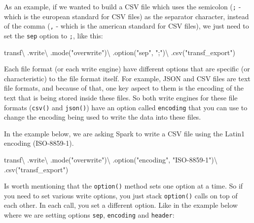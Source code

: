 \documentclass[
  11pt,
  letterpaper,
  DIV=11,
  numbers=noendperiod]{scrreprt}
\newenvironment{Shaded}{\begin{snugshade}}{\end{snugshade}}
\newcommand{\NormalTok}[1]{\textcolor[rgb]{0.00,0.23,0.31}{#1}}
\newcommand{\OperatorTok}[1]{\textcolor[rgb]{0.37,0.37,0.37}{#1}}
\newcommand{\StringTok}[1]{\textcolor[rgb]{0.13,0.47,0.30}{#1}}
\begin{document}
As an example, if we wanted to build a CSV file which uses the semicolon
(\texttt{;} - which is the european standard for CSV files) as the
separator character, instead of the comma (\texttt{,} - which is the
american standard for CSV files), we just need to set the \texttt{sep}
option to \texttt{;}, like this:

\begin{Shaded}
\begin{Highlighting}[]
\NormalTok{transf}\OperatorTok{\textbackslash{}}
\NormalTok{    .write}\OperatorTok{\textbackslash{}}
\NormalTok{    .mode(}\StringTok{"overwrite"}\NormalTok{)}\OperatorTok{\textbackslash{}}
\NormalTok{    .option(}\StringTok{"sep"}\NormalTok{, }\StringTok{";"}\NormalTok{)}\OperatorTok{\textbackslash{}}
\NormalTok{    .csv(}\StringTok{"transf\_export"}\NormalTok{)}
\end{Highlighting}
\end{Shaded}

Each file format (or each write engine) have different options that are
specific (or characteristic) to the file format itself. For example,
JSON and CSV files are text file formats, and because of that, one key
aspect to them is the encoding of the text that is being stored inside
these files. So both write engines for these file formats
(\texttt{csv()} and \texttt{json()}) have an option called
\texttt{encoding} that you can use to change the encoding being used to
write the data into these files.

In the example below, we are asking Spark to write a CSV file using the
Latin1 encoding (ISO-8859-1).

\begin{Shaded}
\begin{Highlighting}[]
\NormalTok{transf}\OperatorTok{\textbackslash{}}
\NormalTok{    .write}\OperatorTok{\textbackslash{}}
\NormalTok{    .mode(}\StringTok{"overwrite"}\NormalTok{)}\OperatorTok{\textbackslash{}}
\NormalTok{    .option(}\StringTok{"encoding"}\NormalTok{, }\StringTok{"ISO{-}8859{-}1"}\NormalTok{)}\OperatorTok{\textbackslash{}}
\NormalTok{    .csv(}\StringTok{"transf\_export"}\NormalTok{)}
\end{Highlighting}
\end{Shaded}

Is worth mentioning that the \texttt{option()} method sets one option at
a time. So if you need to set various write options, you just stack
\texttt{option()} calls on top of each other. In each call, you set a
different option. Like in the example below where we are setting options
\texttt{sep}, \texttt{encoding} and \texttt{header}:
\end{document}
